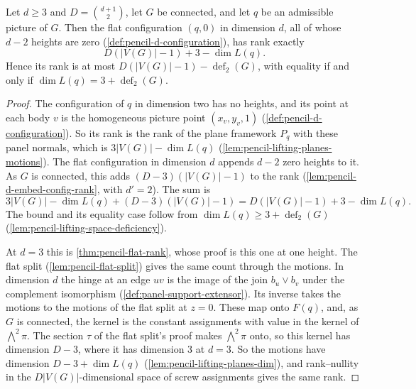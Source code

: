 \begin{theorem}
  \label{thm:pencil-d-flat-rank}
  \leanok
  Let $d \ge 3$ and $D = \binom{d+1}{2}$, let $G$ be connected, and let
  $q$ be an admissible picture of $G$. Then the flat configuration
  $(q, 0)$ in dimension $d$, all of whose $d - 2$ heights are zero
  (\cref{def:pencil-d-configuration}), has rank exactly
  \[
    D(|V(G)| - 1) + 3 - \dim L(q).
  \]
  Hence its rank is at most $D(|V(G)| - 1) - \operatorname{def}_2(G)$,
  with equality if and only if $\dim L(q) = 3 + \operatorname{def}_2(G)$.
\end{theorem}
\begin{proof}
  \leanok
  The configuration of $q$ in dimension two has no heights, and its point
  at each body $v$ is the homogeneous picture point $(x_v, y_v, 1)$
  (\cref{def:pencil-d-configuration}). So its rank is the rank of the
  plane framework $P_q$ with these panel normals, which is
  $3|V(G)| - \dim L(q)$ (\cref{lem:pencil-lifting-planes-motions}). The
  flat configuration in dimension $d$ appends $d - 2$ zero heights to it.
  As $G$ is connected, this adds $(D - 3)(|V(G)| - 1)$ to the rank
  (\cref{lem:pencil-d-embed-config-rank}, with $d' = 2$). The sum is
  \[
    3|V(G)| - \dim L(q) + (D - 3)(|V(G)| - 1)
    = D(|V(G)| - 1) + 3 - \dim L(q).
  \]
  The bound and its equality case follow from
  $\dim L(q) \ge 3 + \operatorname{def}_2(G)$
  (\cref{lem:pencil-lifting-space-deficiency}).

  At $d = 3$ this is \cref{thm:pencil-flat-rank}, whose proof is this one
  at one height. The flat split (\cref{lem:pencil-flat-split}) gives the
  same count through the motions. In dimension $d$ the hinge at an edge
  $uv$ is the image of the join $b_u \vee b_v$ under the complement
  isomorphism (\cref{def:panel-support-extensor}). Its inverse takes the
  motions to the motions of the flat split at $z = 0$. These map onto
  $F(q)$, and, as $G$ is connected, the kernel
  is the constant assignments with value in the kernel of
  $\bigwedge^2 \pi$. The section $\tau$ of the flat split's proof makes
  $\bigwedge^2 \pi$ onto, so this kernel has dimension $D - 3$, where it
  has dimension $3$ at $d = 3$. So the motions have dimension
  $D - 3 + \dim L(q)$ (\cref{lem:pencil-lifting-planes-dim}), and
  rank--nullity in the $D|V(G)|$-dimensional space of screw assignments
  gives the same rank.
\end{proof}

